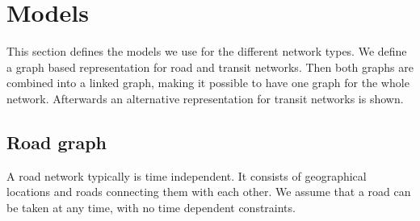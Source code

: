 \section{Models}\label{models}
	This section defines the models we use for the different network types. We define a graph
	based representation for road and transit networks. Then both graphs are combined
	into a linked graph, making it possible to have one graph for the whole network.
	Afterwards an alternative representation for transit networks is shown.
	
\subsection{Road graph}
	A road network typically is time independent. It consists of geographical locations and roads connecting them with each other.
	We assume that a road can be taken at any time, with no time dependent constraints.
	
